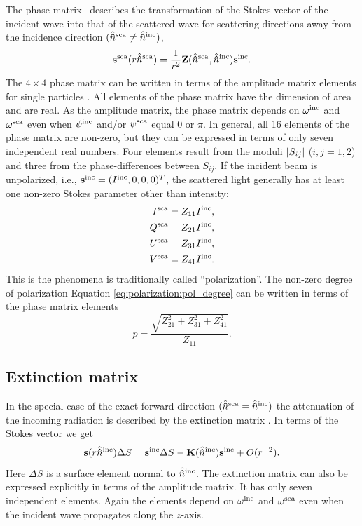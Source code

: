 The phase matrix \PhaMat\ describes the transformation of the Stokes
vector of the incident wave into that of the scattered wave for
scattering directions away from the incidence direction
$(\hat{{\bf \hat{n}}}^{\mathrm{sca}}\neq\hat{{\bf \hat{n}}}^{\mathrm{inc}})$,
\begin{equation}
  \label{eq:rtetheory:phase_matrix}
  {\bf s}^{\mathrm{sca}}(r \hat{{\bf \hat{n}}}^{\mathrm{sca}}) =
    \frac{1}{r^2}{\bf Z}(\hat{{\bf \hat{n}}}^{\mathrm{sca}},\hat{{\bf \hat{n}}}^{\mathrm{inc}}) {\bf s}^{\mathrm{inc}}.
\end{equation}
The $4\times4$ phase matrix can be written in terms of the amplitude
matrix elements for single particles \citep{Mishchenko:02}. All
elements of the phase matrix have the dimension of area and are real.
As the amplitude matrix, the phase matrix depends on $\omega^{\mathrm{inc}}$
and $\omega^{\mathrm{sca}}$ even when $\psi^{\mathrm{inc}}$ and/or $\psi^{\mathrm{sca}}$ equal
0 or $\pi$.  In general, all 16 elements of the phase matrix are
non-zero, but they can be expressed in terms of only seven independent
real numbers. Four elements result from the moduli $\left| S_{ij} \right| $ ($i,j =
1,2$) and three from the phase-differences between $S_{ij}$.  If the
incident beam is unpolarized, i.e., ${\bf s}^{\mathrm{inc}} = (I^{\mathrm{inc}},
0, 0, 0)^T$, the scattered light generally has at least one
non-zero Stokes parameter other than intensity:
\begin{eqnarray}
  I^{\mathrm{sca}} &= Z_{11}I^{\mathrm{inc}},\\
  Q^{\mathrm{sca}} &= Z_{21}I^{\mathrm{inc}},\\
  U^{\mathrm{sca}} &= Z_{31}I^{\mathrm{inc}},\\
  V^{\mathrm{sca}} &= Z_{41}I^{\mathrm{inc}}.
\end{eqnarray}
This is the phenomena is traditionally called ``polarization''. The
non-zero degree of polarization Equation \ref{eq:polarization:pol_degree}
can be written in terms of the phase matrix elements
\begin{equation}
  p = \frac{\sqrt{Z_{21}^2+Z_{31}^2+Z_{41}^2}}{Z_{11}}.
\end{equation}


\subsection{Extinction matrix}
\label{sec:rtetheory:ext_mat}
In the special case of the exact forward direction
$(\hat{{\bf \hat{n}}}^{\mathrm{sca}}=\hat{{\bf \hat{n}}}^{\mathrm{inc}})$ the attenuation of the
incoming radiation is described by the extinction matrix \ExtMat. In
terms of the Stokes vector we get
\begin{equation}
  {\bf s}(r \hat{{\bf \hat{n}}}^{\mathrm{inc}}) \Delta S =
    {\bf s}^{\mathrm{inc}} \Delta S - {\bf K}(\hat{{\bf \hat{n}}}^{\mathrm{inc}}) {\bf s}^{\mathrm{inc}} + O(r^{-2}).
\end{equation}
Here $\Delta S$ is a surface element normal to
$\hat{{\bf \hat{n}}}^{\mathrm{inc}}$.  The extinction matrix can also be expressed
explicitly in terms of the amplitude matrix. It has only seven
independent elements. Again the elements depend on $\omega^{\mathrm{inc}}$ and
$\omega^{\mathrm{sca}}$ even when the incident wave propagates along the
$z$-axis.

